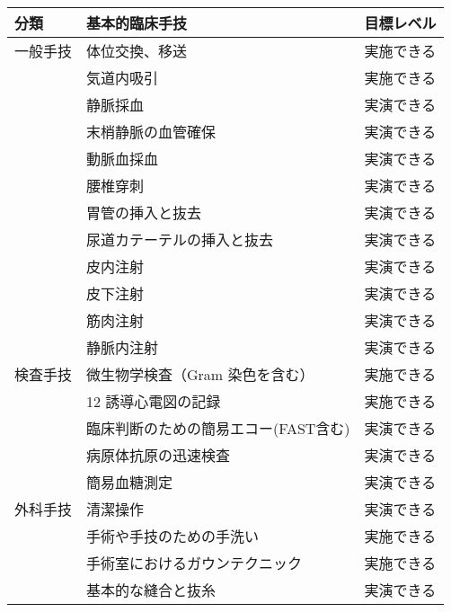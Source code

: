 \begin{xltabular}{\linewidth}{XXX}
\caption{\label{tbl:基本的臨床手技}} \\
\toprule
分類 & 基本的臨床手技 & 目標レベル \\
\midrule
\endhead
一般手技 & 体位交換、移送 & 実施できる \\
 & 気道内吸引 & 実施できる \\
 & 静脈採血 & 実演できる \\
 & 末梢静脈の血管確保 & 実演できる \\
 & 動脈血採血 & 実演できる \\
 & 腰椎穿刺 & 実演できる \\
 & 胃管の挿入と抜去 & 実演できる \\
 & 尿道カテーテルの挿入と抜去 & 実演できる \\
 & 皮内注射 & 実演できる \\
 & 皮下注射 & 実演できる \\
 & 筋肉注射 & 実演できる \\
 & 静脈内注射 & 実演できる \\
検査手技 & 微生物学検査（Gram 染色を含む） & 実施できる \\
 & 12 誘導心電図の記録 & 実施できる \\
 & 臨床判断のための簡易エコー(FAST含む) & 実演できる \\
 & 病原体抗原の迅速検査 & 実演できる \\
 & 簡易血糖測定 & 実演できる \\
外科手技 & 清潔操作 & 実演できる \\
 & 手術や手技のための手洗い & 実施できる \\
 & 手術室におけるガウンテクニック & 実施できる \\
 & 基本的な縫合と抜糸 & 実演できる \\
\bottomrule
\end{xltabular}




